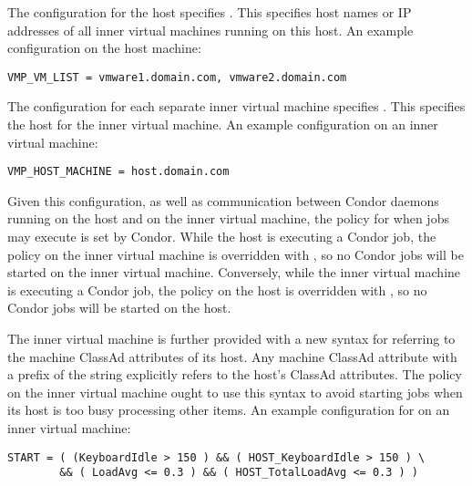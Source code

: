 The configuration for the host specifies .
This specifies host names or IP addresses of all inner virtual machines
running on this host.
An example configuration on the host machine:

\footnotesize
\begin{verbatim}
VMP_VM_LIST = vmware1.domain.com, vmware2.domain.com
\end{verbatim}
\normalsize


The configuration for each separate inner virtual machine specifies
.
This specifies the host for the inner virtual machine.
An example configuration on an inner virtual machine:

\footnotesize
\begin{verbatim}
VMP_HOST_MACHINE = host.domain.com
\end{verbatim}
\normalsize

Given this configuration, as well as communication between
Condor daemons running on the host and on the inner virtual machine,
the policy for when jobs may execute is set by Condor.
While the host is executing a Condor job,
the  policy on the inner virtual machine
is overridden with ,
so no Condor jobs will be started on the inner virtual machine.
Conversely, while the inner virtual machine is executing a Condor job,
the  policy on the host
is overridden with ,
so no Condor jobs will be started on the host.

The inner virtual machine is further provided with a new syntax for
referring to the machine ClassAd attributes of its host.
Any machine ClassAd attribute with a prefix of the string
 explicitly refers to the host's ClassAd attributes.
The  policy on the inner virtual machine
ought to use this syntax to avoid starting jobs when its host is
too busy processing other items.
An example configuration for  on an inner virtual machine:

\footnotesize
\begin{verbatim}
START = ( (KeyboardIdle > 150 ) && ( HOST_KeyboardIdle > 150 ) \
        && ( LoadAvg <= 0.3 ) && ( HOST_TotalLoadAvg <= 0.3 ) )
\end{verbatim}
\normalsize

